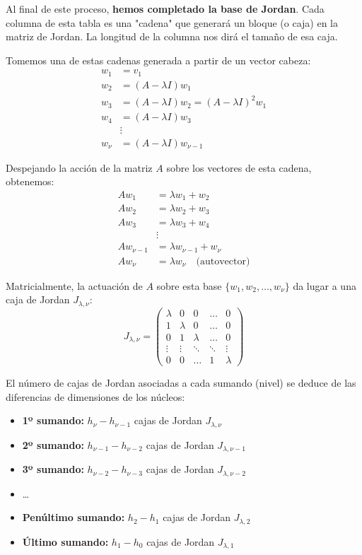 Al final de este proceso, \textbf{hemos completado la base de Jordan}. Cada columna de esta tabla es una "cadena" que generará un bloque (o caja) en la matriz de Jordan. La longitud de la columna nos dirá el tamaño de esa caja.

Tomemos una de estas cadenas generada a partir de un vector cabeza:
\begin{align*}
    w_1 &= v_1 \\
    w_2 &= (A-\lambda I)w_1 \\
    w_3 &= (A-\lambda I)w_2 = (A-\lambda I)^2 w_1 \\
    w_4 &= (A-\lambda I)w_3 \\
    &\vdots \\
    w_\nu &= (A-\lambda I)w_{\nu-1}
\end{align*}

Despejando la acción de la matriz $A$ sobre los vectores de esta cadena, obtenemos:
\begin{align*}
    A w_1 &= \lambda w_1 + w_2 \\
    A w_2 &= \lambda w_2 + w_3 \\
    A w_3 &= \lambda w_3 + w_4 \\
    &\vdots \\
    A w_{\nu-1} &= \lambda w_{\nu-1} + w_\nu \\
    A w_\nu &= \lambda w_\nu \quad \text{(autovector)}
\end{align*}

Matricialmente, la actuación de $A$ sobre esta base $\{w_1, w_2, \dots, w_\nu\}$ da lugar a una caja de Jordan $J_{\lambda, \nu}$:
\[
    J_{\lambda, \nu} = \begin{pmatrix} 
    \lambda & 0 & 0 & \dots & 0 \\ 
    1 & \lambda & 0 & \dots & 0 \\ 
    0 & 1 & \lambda & \dots & 0 \\ 
    \vdots & \vdots & \ddots & \ddots & \vdots \\ 
    0 & 0 & \dots & 1 & \lambda 
    \end{pmatrix}
\]

El número de cajas de Jordan asociadas a cada sumando (nivel) se deduce de las diferencias de dimensiones de los núcleos:
\begin{itemize}
    \item \textbf{1º sumando:} $h_\nu - h_{\nu-1}$ cajas de Jordan $J_{\lambda, \nu}$
    \item \textbf{2º sumando:} $h_{\nu-1} - h_{\nu-2}$ cajas de Jordan $J_{\lambda, \nu-1}$
    \item \textbf{3º sumando:} $h_{\nu-2} - h_{\nu-3}$ cajas de Jordan $J_{\lambda, \nu-2}$
    \item \dots
    \item \textbf{Penúltimo sumando:} $h_2 - h_1$ cajas de Jordan $J_{\lambda, 2}$
    \item \textbf{Último sumando:} $h_1 - h_0$ cajas de Jordan $J_{\lambda, 1}$
\end{itemize}

